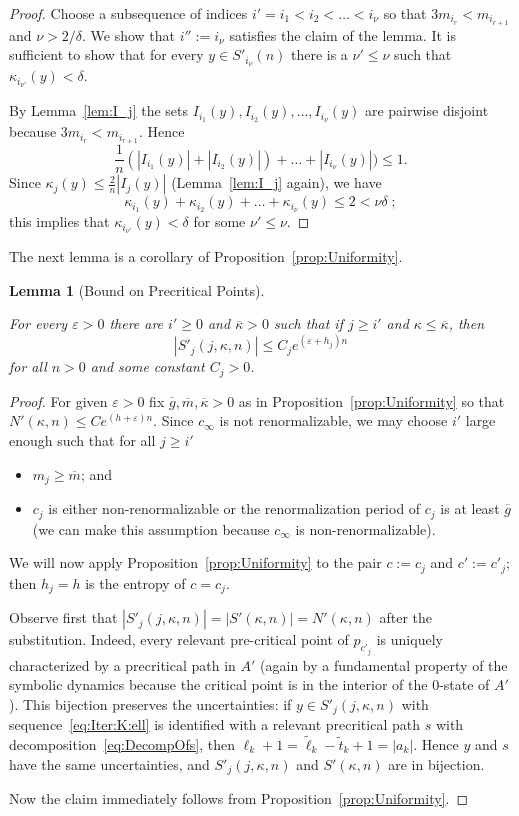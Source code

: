 \documentclass[12pt]{amsart}
\newcommand{\0}{\texttt{0}}
\newcommand{\1}{\texttt{1}}
\newcommand\eps{\varepsilon}
\newtheorem{lemma}[theorem]{Lemma}
\theoremstyle{definition}
\numberwithin{equation}{section}
\newcommand{\ovl}[1]{\overline{#1}}
\newcommand{\lineclear}{\rule{0pt}{2pt}\newline}
\begin{document}
\begin{proof}
Choose a subsequence of indices $i'=i_1< i_2< \dots < i_\nu$ so that $3m_{i_r}< m_{i_{r+1}}$ and $\nu> 2/\delta$. We show that $i'':= i_\nu$ satisfies the claim of the lemma. It is sufficient to show that for every $y\in S'_{i_\nu}(n)$ there is a $\nu'\le \nu$ such that $\kappa_{i_{\nu'}}(y)<\delta$.  

By Lemma~\ref{lem:I_j} the sets $I_{i_1}(y), I_{i_2}(y), \dots , I_{i_\nu}(y)$ are pairwise disjoint because $3m_{i_r}< m_{i_{r+1}}$. 
Hence
\[
\frac 1 n (|I_{i_1}(y)|+ |I_{i_2}(y)|) + \dots + |I_{i_\nu}(y)|) \le 1.
\]
Since $\kappa_j(y) \le  \frac 2 n |I_j(y)|$ (Lemma~\ref{lem:I_j} again), we have 
\[
\kappa_{i_1}(y)+\kappa_{i_2}(y)+\dots +\kappa_{i_\nu}(y)\le 2 < \nu\delta
\;;
\]
this implies that $\kappa_{i_{\nu'}}(y)<\delta$ for some $\nu'\le \nu$. 
\end{proof}


The next lemma is a corollary of Proposition~\ref{prop:Uniformity}. 
\begin{lemma}[Bound on Precritical Points]
\label{lem:RefOfprop:Uniformity}\lineclear
For every $\eps>0$ there are $i'\ge 0$ and $\overline \kappa>0$ such that if $ j \ge i'$ and $\kappa\le \overline \kappa$, then 
\[|S'_j(j,\kappa,n)|\le C_j e^{(\eps+h_j) n}\] for all $n>0$ and some constant $C_j>0$.
\end{lemma}
\begin{proof}
For given $\eps>0$ fix $\overline g, \overline m, \ovl\kappa>0 $ as in Proposition~\ref{prop:Uniformity} so that $N'(\kappa,n)\le Ce^{(h+\eps)n}$. Since $c_{\infty}$ is not renormalizable, we may choose $i'$ large enough such that for all $j\ge i'$
\begin{itemize}
\item $m_j\ge \overline m$; and
\item $c_j$ is either non-renormalizable
 or the renormalization period of $c_j$ is at least $\overline g$ (we can make this assumption because $c_\infty$ is non-renormalizable). 
\end{itemize}

We will now apply Proposition~\ref{prop:Uniformity} to the pair $c:=c_j$ and $c':= c'_j$; then $h_j=h$ is the entropy of $c=c_j$. 

 Observe first that $|S'_j(j, \kappa,n)| = |S'( \kappa, n)|= N'(\kappa,n)$ after the substitution. Indeed, every relevant pre-critical point of $p_{c'_j}$ is uniquely characterized by a precritical path in $A'$ (again by a fundamental property of the symbolic dynamics because the critical point is in the interior of the $0$-state of $A'$). This bijection preserves the uncertainties: if $y\in S'_j(j,\kappa,n)$ with sequence~\eqref{eq:Iter:K:ell} is identified with a relevant precritical path $s$ with decomposition~\eqref{eq:DecompOfs}, then $\ell_k +1 =\tilde \ell_k - \tilde t_k +1= |a_k|$. Hence $y$ and $s$ have the same uncertainties, and $S'_j(j, \kappa,n)$ and $S'( \kappa, n)$ are in bijection. 

Now the claim immediately follows from Proposition~\ref{prop:Uniformity}.
\end{proof}
\end{document}

